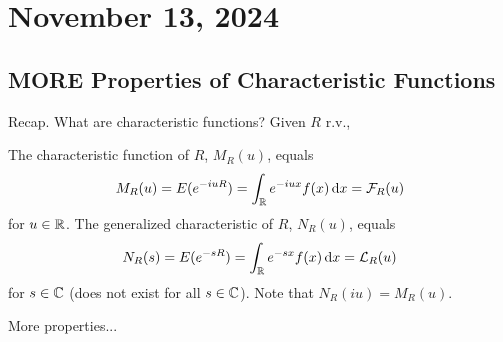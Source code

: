\section{November 13, 2024}

\subsection{MORE Properties of Characteristic Functions}
Recap. What are characteristic functions? Given $R$ r.v.,
\begin{definition}
    The characteristic function of $R$, $M_R(u)$, equals
    \begin{align}
        M_R(u) = E(e^{-iuR}) = \int_{\mathbb{R}} e^{-iux} f(x) \dd{x} = \mathcal{F}_R(u)
    \end{align}
    for $u \in \mathbb{R}$. The generalized characteristic of $R$, $N_R(u)$, equals
    \begin{align}
        N_R(s) = E(e^{-sR}) = \int_{\mathbb{R}} e^{-sx} f(x) \dd{x} = \mathcal{L}_R(u)
    \end{align}
    for $s \in \mathbb{C}$ (does not exist for all $s \in \mathbb{C}$). Note that $N_R(iu) = M_R(u)$.
\end{definition}
More properties...
